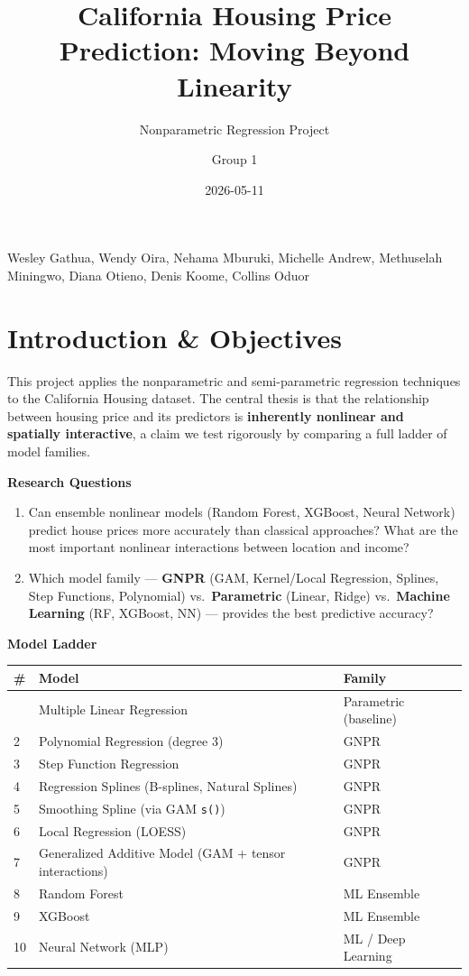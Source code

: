 \documentclass[
]{article}
\title{California Housing Price Prediction: Moving Beyond Linearity}
\subtitle{Nonparametric Regression Project}
\author{Group 1}
\date{2026-05-11}
\newcounter{none} %
\begin{document}
\maketitle

{
\setcounter{tocdepth}{3}
\tableofcontents
}
Wesley Gathua, Wendy Oira, Nehama Mburuki, Michelle Andrew, Methuselah
Miningwo, Diana Otieno, Denis Koome, Collins Oduor

\section{Introduction \& Objectives}\label{introduction-objectives}

This project applies the nonparametric and semi-parametric regression
techniques to the California Housing dataset. The central thesis is that
the relationship between housing price and its predictors is
\textbf{inherently nonlinear and spatially interactive}, a claim we test
rigorously by comparing a full ladder of model families.

\textbf{Research Questions}

\begin{enumerate}
\def\labelenumi{\arabic{enumi}.}
\item
  Can ensemble nonlinear models (Random Forest, XGBoost, Neural Network)
  predict house prices more accurately than classical approaches? What
  are the most important nonlinear interactions between location and
  income?
\item
  Which model family --- \textbf{GNPR} (GAM, Kernel/Local Regression,
  Splines, Step Functions, Polynomial) vs.~\textbf{Parametric} (Linear,
  Ridge) vs.~\textbf{Machine Learning} (RF, XGBoost, NN) --- provides
  the best predictive accuracy?
\end{enumerate}

\textbf{Model Ladder}

{\def\LTcaptype{none} %
\begin{longtable}[]{@{}lll@{}}
\toprule\noalign{}
\# & Model & Family \\
\midrule\noalign{}
\endhead
\bottomrule\noalign{}
\endlastfoot
1 & Multiple Linear Regression & Parametric (baseline) \\
2 & Polynomial Regression (degree 3) & GNPR \\
3 & Step Function Regression & GNPR \\
4 & Regression Splines (B-splines, Natural Splines) & GNPR \\
5 & Smoothing Spline (via GAM \texttt{s()}) & GNPR \\
6 & Local Regression (LOESS) & GNPR \\
7 & Generalized Additive Model (GAM + tensor interactions) & GNPR \\
8 & Random Forest & ML Ensemble \\
9 & XGBoost & ML Ensemble \\
10 & Neural Network (MLP) & ML / Deep Learning \\
\end{longtable}
}
\end{document}
